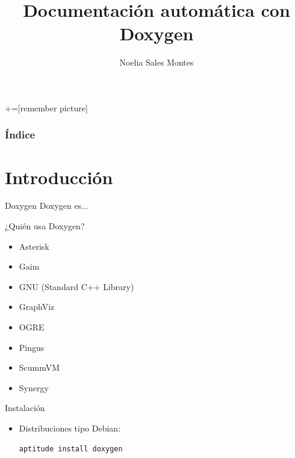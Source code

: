 \documentclass[12pt,xcolor=svgnames]{beamer}
\title[Doxygen]{Documentación automática con Doxygen}
\author[Noelia Sales]{Noelia Sales Montes}
\institute[DV - UCA]{Diseño de Videojuegos\\
Universidad de Cádiz}
\date{}
\begin{document}
+=[remember picture]
\everymath{\displaystyle}

\begin{frame}
 \titlepage
\end{frame}

\begin{frame}
\frametitle{Índice} 
\transboxin
\tableofcontents
\end{frame}

\section{Introducción}

\begin{frame}{Doxygen}
  Doxygen es...
\end{frame}

\begin{frame}{¿Quién usa Doxygen?}
  \begin{itemize}
  \item Asterisk
  \item Gaim
  \item GNU (Standard C++ Library)
  \item GraphViz
  \item OGRE
  \item Pingus
  \item ScummVM
  \item Synergy
  \end{itemize}
\end{frame}

\begin{frame}[fragile]{Instalación}
  \begin{itemize}
  \item Distribuciones tipo Debian:
    \begin{verbatim}
aptitude install doxygen
    \end{verbatim}    
  \end{itemize}
\end{frame}
\end{document}
